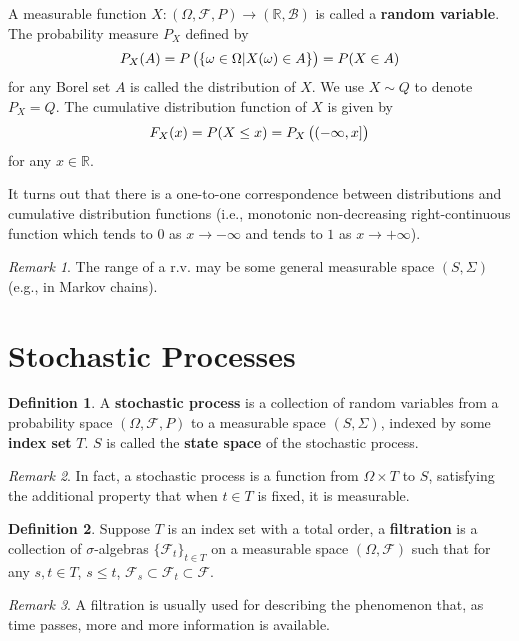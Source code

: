 \documentclass[openany]{book}
\theoremstyle{definition}
\newtheorem{definition}{Definition}[chapter]
\theoremstyle{remark}
\newtheorem*{remark}{Remark}
\begin{document}
A measurable function $X:(\Omega,\mathcal{F},P)\rightarrow(\mathbb{R},\mathcal{B})$ is called a \textbf{random variable}. The probability measure $P_X$ defined by
\begin{equation*}
    P_X(A)=P\del{\{\omega\in\Omega|X(\omega)\in A\}}=P(X\in A)
\end{equation*}
for any Borel set $A$ is called the distribution of $X$. We use $X\sim Q$ to denote $P_X=Q$. The cumulative distribution function of $X$ is given by
\begin{equation*}
    F_X(x)=P(X\le x)=P_X\del{(-\infty,x]}
\end{equation*}
for any $x\in \mathbb{R}$.

It turns out that there is a one-to-one correspondence between distributions and cumulative distribution functions (i.e., monotonic non-decreasing right-continuous function which tends to 0 as $x\to-\infty$ and tends to $1$ as $x\to+\infty$).
\begin{remark}
    The range of a r.v. may be some general measurable space $(S,\Sigma)$ (e.g., in Markov chains).
\end{remark}

\section{Stochastic Processes}
\begin{definition}
    A \textbf{stochastic process} is a collection of random variables from a probability space $(\Omega,\mathcal{F},P)$ to a measurable space $(S,\Sigma)$, indexed by some \textbf{index set} $T$. $S$ is called the \textbf{state space} of the stochastic process.
\end{definition}
\begin{remark}
    In fact, a stochastic process is a function from $\Omega\times T$ to $S$, satisfying the additional property that when $t\in T$ is fixed, it is measurable.
\end{remark}

\begin{definition}
    Suppose $T$ is an index set with a total order, a \textbf{filtration} is a collection of $\sigma$-algebras $\{\mathcal{F}_t\}_{t\in T}$ on a measurable space $(\Omega,\mathcal{F})$ such that for any $s,t\in T$, $s\le t$, $\mathcal{F}_s\subset \mathcal{F}_t\subset \mathcal{F}$.
\end{definition}
\begin{remark}
    A filtration is usually used for describing the phenomenon that, as time passes, more and more information is available.
\end{remark}
\end{document}
